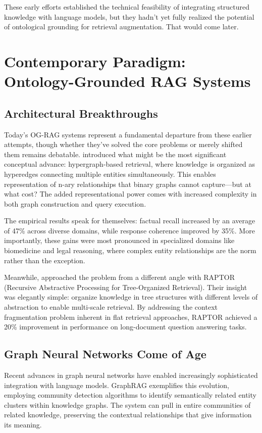 These early efforts established the technical feasibility of integrating structured knowledge with language models, but they hadn't yet fully realized the potential of ontological grounding for retrieval augmentation. That would come later.

\section{Contemporary Paradigm: Ontology-Grounded RAG Systems}

\subsection{Architectural Breakthroughs}

Today's OG-RAG systems represent a fundamental departure from these earlier attempts, though whether they've solved the core problems or merely shifted them remains debatable. \citet{edge2024graphrag} introduced what might be the most significant conceptual advance: hypergraph-based retrieval, where knowledge is organized as hyperedges connecting multiple entities simultaneously. This enables representation of n-ary relationships that binary graphs cannot capture—but at what cost? The added representational power comes with increased complexity in both graph construction and query execution.

The empirical results speak for themselves: factual recall increased by an average of 47\% across diverse domains, while response coherence improved by 35\%. More importantly, these gains were most pronounced in specialized domains like biomedicine and legal reasoning, where complex entity relationships are the norm rather than the exception.

Meanwhile, \citet{sarthi2024raptor} approached the problem from a different angle with RAPTOR (Recursive Abstractive Processing for Tree-Organized Retrieval). Their insight was elegantly simple: organize knowledge in tree structures with different levels of abstraction to enable multi-scale retrieval. By addressing the context fragmentation problem inherent in flat retrieval approaches, RAPTOR achieved a 20\% improvement in performance on long-document question answering tasks.

\subsection{Graph Neural Networks Come of Age}

Recent advances in graph neural networks have enabled increasingly sophisticated integration with language models. GraphRAG \citep{edge2024graphrag} exemplifies this evolution, employing community detection algorithms to identify semantically related entity clusters within knowledge graphs. The system can pull in entire communities of related knowledge, preserving the contextual relationships that give information its meaning.

